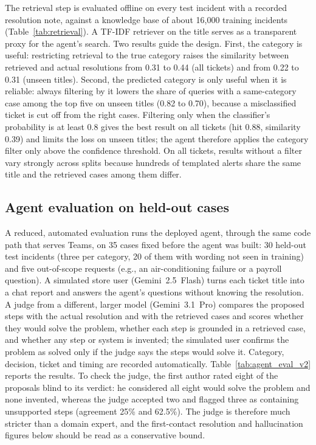 \documentclass[conference]{IEEEtran}
\begin{document}
The retrieval step is evaluated offline on every test incident with a recorded resolution note, against a
knowledge base of about 16,000 training incidents (Table~\ref{tab:retrieval}). A TF-IDF retriever on the title
serves as a transparent proxy for the agent's search. Two results guide the design. First, the category is
useful: restricting retrieval to the true category raises the similarity between retrieved and actual
resolutions from 0.31 to 0.44 (all tickets) and from 0.22 to 0.31 (unseen titles). Second, the predicted category
is only useful when it is reliable: always filtering by it lowers the share of queries with a same-category case
among the top five on unseen titles (0.82 to 0.70), because a misclassified ticket is cut off from the right
cases. Filtering only when the classifier's probability is at least 0.8 gives the best result on all tickets
(hit 0.88, similarity 0.39) and limits the loss on unseen titles; the agent therefore applies the category filter
only above the confidence threshold. On all tickets, results without a filter vary strongly across splits because
hundreds of templated alerts share the same title and the retrieved cases among them differ.

\subsection{Agent evaluation on held-out cases}


A reduced, automated evaluation runs the deployed agent, through the same code path that serves Teams, on 35
cases fixed before the agent was built: 30 held-out test incidents (three per category, 20 of them with wording
not seen in training) and five out-of-scope requests (e.g., an air-conditioning failure or a payroll question).
A simulated store user (Gemini~2.5~Flash) turns each ticket title into a chat report and answers the agent's
questions without knowing the resolution. A judge from a different, larger model (Gemini~3.1~Pro) compares the
proposed steps with the actual resolution and with the retrieved cases and scores whether they would solve the
problem, whether each step is grounded in a retrieved case, and whether any step or system is invented; the
simulated user confirms the problem as solved only if the judge says the steps would solve it. Category, decision,
ticket and timing are recorded automatically. Table~\ref{tab:agent_eval_v2} reports the results. To check the
judge, the first author rated eight of the proposals blind to its verdict: he considered all eight would solve the
problem and none invented, whereas the judge accepted two and flagged three as containing unsupported steps
(agreement 25\% and 62.5\%). The judge is therefore much stricter than a domain expert, and the first-contact
resolution and hallucination figures below should be read as a conservative bound.
\end{document}
